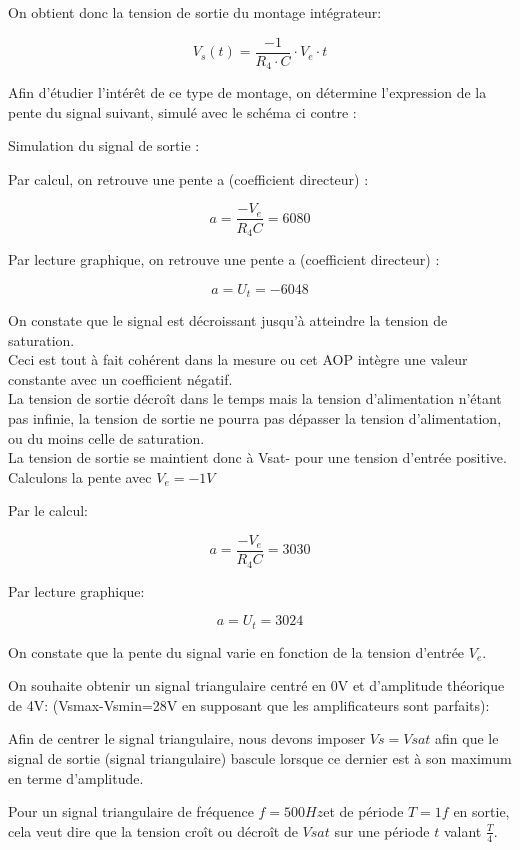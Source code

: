 {On obtient donc la tension de sortie du montage intégrateur:

$$ V_s(t)=\frac{-1}{R_4\cdot C} \cdot V_e \cdot t $$


Afin d’étudier l'intérêt de ce type de montage, on détermine l’expression de la pente du signal suivant, simulé avec le schéma ci contre :


Simulation du signal de sortie : 




Par calcul, on retrouve une pente a (coefficient directeur) :

$$ a=\frac{-V_e}{R_4C}= 6080 $$

Par lecture graphique, on retrouve une pente a (coefficient directeur) :

$$ a=U_t=-6048 $$

On constate que le signal est décroissant jusqu’à atteindre la tension de saturation. \\
Ceci est tout à fait cohérent dans la mesure ou cet AOP intègre une valeur constante avec un coefficient négatif.\\
 La tension de sortie décroît dans le temps mais la tension d'alimentation n’étant pas infinie, 
 la tension de sortie ne pourra pas dépasser la tension d’alimentation, ou du moins celle de saturation.\\
  La tension de sortie se maintient donc à Vsat- pour une tension d’entrée positive.\\


Calculons la pente avec $V_e= -1V$

Par le calcul: 

$$ a=\frac{-V_e}{R_4C}= 3030$$

Par lecture graphique:

$$ a=U_t=3024$$

On constate que la pente du signal varie en fonction de la tension d’entrée $V_e$.

On souhaite obtenir un signal triangulaire centré en 0V et d’amplitude théorique de 4V:
(Vsmax-Vsmin=28V en supposant que les amplificateurs sont parfaits):

Afin de centrer le signal triangulaire, nous devons imposer $Vs= Vsat$ afin que le signal de sortie (signal triangulaire) bascule lorsque ce dernier est à son maximum en terme d’amplitude.

Pour un signal triangulaire de fréquence $f=500Hz$et de période $T=1f$ en sortie, cela veut dire que la tension croît ou décroît de $Vsat$ sur une période $t$ valant $\frac{T}{4}$.

}
